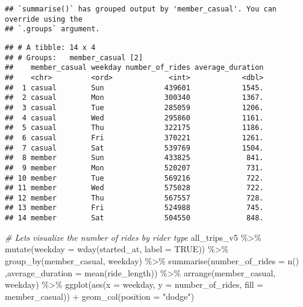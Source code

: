 \documentclass[
]{article}
\newenvironment{Shaded}{\begin{snugshade}}{\end{snugshade}}
\newcommand{\AttributeTok}[1]{\textcolor[rgb]{0.77,0.63,0.00}{#1}}
\newcommand{\CommentTok}[1]{\textcolor[rgb]{0.56,0.35,0.01}{\textit{#1}}}
\newcommand{\ConstantTok}[1]{\textcolor[rgb]{0.00,0.00,0.00}{#1}}
\newcommand{\FunctionTok}[1]{\textcolor[rgb]{0.00,0.00,0.00}{#1}}
\newcommand{\NormalTok}[1]{#1}
\newcommand{\SpecialCharTok}[1]{\textcolor[rgb]{0.00,0.00,0.00}{#1}}
\newcommand{\StringTok}[1]{\textcolor[rgb]{0.31,0.60,0.02}{#1}}
\begin{document}
\begin{verbatim}
## `summarise()` has grouped output by 'member_casual'. You can override using the
## `.groups` argument.
\end{verbatim}

\begin{verbatim}
## # A tibble: 14 x 4
## # Groups:   member_casual [2]
##    member_casual weekday number_of_rides average_duration
##    <chr>         <ord>             <int>            <dbl>
##  1 casual        Sun              439601            1545.
##  2 casual        Mon              300340            1367.
##  3 casual        Tue              285059            1206.
##  4 casual        Wed              295860            1161.
##  5 casual        Thu              322175            1186.
##  6 casual        Fri              370221            1261.
##  7 casual        Sat              539769            1504.
##  8 member        Sun              433825             841.
##  9 member        Mon              520207             731.
## 10 member        Tue              569216             722.
## 11 member        Wed              575028             722.
## 12 member        Thu              567557             728.
## 13 member        Fri              524988             745.
## 14 member        Sat              504550             848.
\end{verbatim}

\begin{Shaded}
\begin{Highlighting}[]
\CommentTok{\# Let\textquotesingle{}s visualize the number of rides by rider type}
\NormalTok{all\_trips\_v5 }\SpecialCharTok{\%\textgreater{}\%} 
  \FunctionTok{mutate}\NormalTok{(}\AttributeTok{weekday =} \FunctionTok{wday}\NormalTok{(started\_at, }\AttributeTok{label =} \ConstantTok{TRUE}\NormalTok{)) }\SpecialCharTok{\%\textgreater{}\%} 
  \FunctionTok{group\_by}\NormalTok{(member\_casual, weekday) }\SpecialCharTok{\%\textgreater{}\%} 
  \FunctionTok{summarise}\NormalTok{(}\AttributeTok{number\_of\_rides =} \FunctionTok{n}\NormalTok{()}
\NormalTok{            ,}\AttributeTok{average\_duration =} \FunctionTok{mean}\NormalTok{(ride\_length)) }\SpecialCharTok{\%\textgreater{}\%} 
  \FunctionTok{arrange}\NormalTok{(member\_casual, weekday)  }\SpecialCharTok{\%\textgreater{}\%} 
  \FunctionTok{ggplot}\NormalTok{(}\FunctionTok{aes}\NormalTok{(}\AttributeTok{x =}\NormalTok{ weekday, }\AttributeTok{y =}\NormalTok{ number\_of\_rides, }\AttributeTok{fill =}\NormalTok{ member\_casual)) }\SpecialCharTok{+}
  \FunctionTok{geom\_col}\NormalTok{(}\AttributeTok{position =} \StringTok{"dodge"}\NormalTok{)}
\end{Highlighting}
\end{Shaded}
\end{document}
